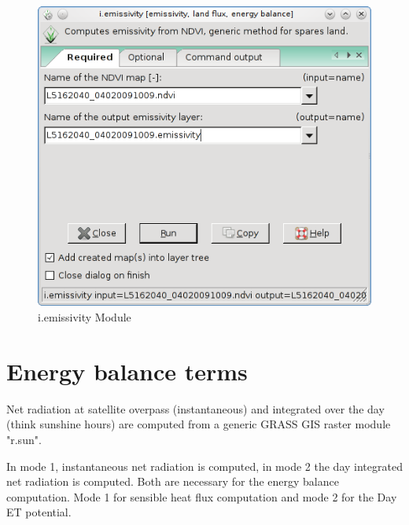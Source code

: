 \begin{figure}[htbp]
   \centering
   \includegraphics[scale=0.4]{gipe019.png}
   \caption{i.emissivity Module}
   \label{fig:gipe019}
\end{figure}


\section{Energy balance terms}

Net radiation at satellite overpass (instantaneous) and integrated over the day (think sunshine hours) are computed from a generic GRASS GIS raster module "r.sun".\newline

In mode 1, instantaneous net radiation is computed, in mode 2 the day integrated net radiation is computed. Both are necessary for the energy balance computation. Mode 1 for sensible heat flux computation and mode 2 for the Day ET potential.\newline

